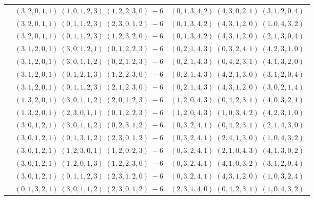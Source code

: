 \documentclass[11pt]{article}
\begin{document}
\begin{longtable}[l]{|c|c|c|}
 \cline{2-3} 
 & $(3 ,2 ,0 ,1 ,1) \;(1 ,0 ,1 ,2 ,3) \;(1 ,2 ,2 ,3 ,0) \;-6$ & $(0 ,1 ,3 ,4 ,2) \;(4 ,3 ,0 ,2 ,1) \;(3 ,1 ,2 ,0 ,4) \;$\\ 
 \cline{2-3} 
 & $(3 ,2 ,0 ,1 ,1) \;(0 ,1 ,1 ,2 ,3) \;(2 ,3 ,0 ,1 ,2) \;-6$ & $(0 ,1 ,3 ,4 ,2) \;(4 ,3 ,1 ,2 ,0) \;(1 ,0 ,4 ,3 ,2) \;$\\ 
 \cline{2-3} 
 & $(3 ,2 ,0 ,1 ,1) \;(0 ,1 ,1 ,2 ,3) \;(1 ,2 ,3 ,2 ,0) \;-6$ & $(0 ,1 ,3 ,4 ,2) \;(4 ,3 ,1 ,2 ,0) \;(2 ,1 ,3 ,0 ,4) \;$\\ 
 \cline{2-3} 
 & $(3 ,1 ,2 ,0 ,1) \;(3 ,0 ,1 ,2 ,1) \;(0 ,1 ,2 ,2 ,3) \;-6$ & $(0 ,2 ,1 ,4 ,3) \;(0 ,3 ,2 ,4 ,1) \;(4 ,2 ,3 ,1 ,0) \;$\\ 
 \cline{2-3} 
 & $(3 ,1 ,2 ,0 ,1) \;(3 ,0 ,1 ,1 ,2) \;(0 ,2 ,1 ,2 ,3) \;-6$ & $(0 ,2 ,1 ,4 ,3) \;(0 ,4 ,2 ,3 ,1) \;(4 ,1 ,3 ,2 ,0) \;$\\ 
 \cline{2-3} 
 & $(3 ,1 ,2 ,0 ,1) \;(0 ,1 ,2 ,1 ,3) \;(1 ,2 ,2 ,3 ,0) \;-6$ & $(0 ,2 ,1 ,4 ,3) \;(4 ,2 ,1 ,3 ,0) \;(3 ,1 ,2 ,0 ,4) \;$\\ 
 \cline{2-3} 
 & $(3 ,1 ,2 ,0 ,1) \;(0 ,1 ,1 ,2 ,3) \;(2 ,1 ,2 ,3 ,0) \;-6$ & $(0 ,2 ,1 ,4 ,3) \;(4 ,3 ,1 ,2 ,0) \;(3 ,0 ,2 ,1 ,4) \;$\\ 
 \cline{2-3} 
 & $(1 ,3 ,2 ,0 ,1) \;(3 ,0 ,1 ,1 ,2) \;(2 ,0 ,1 ,2 ,3) \;-6$ & $(1 ,2 ,0 ,4 ,3) \;(0 ,4 ,2 ,3 ,1) \;(4 ,0 ,3 ,2 ,1) \;$\\ 
 \cline{2-3} 
 & $(1 ,3 ,2 ,0 ,1) \;(2 ,3 ,0 ,1 ,1) \;(0 ,1 ,2 ,2 ,3) \;-6$ & $(1 ,2 ,0 ,4 ,3) \;(1 ,0 ,3 ,4 ,2) \;(4 ,2 ,3 ,1 ,0) \;$\\ 
 \cline{2-3} 
 & $(3 ,0 ,1 ,2 ,1) \;(3 ,0 ,1 ,1 ,2) \;(0 ,2 ,3 ,1 ,2) \;-6$ & $(0 ,3 ,2 ,4 ,1) \;(0 ,4 ,2 ,3 ,1) \;(2 ,1 ,4 ,3 ,0) \;$\\ 
 \cline{2-3} 
 & $(3 ,0 ,1 ,2 ,1) \;(0 ,1 ,3 ,1 ,2) \;(2 ,3 ,0 ,1 ,2) \;-6$ & $(0 ,3 ,2 ,4 ,1) \;(2 ,4 ,1 ,3 ,0) \;(1 ,0 ,4 ,3 ,2) \;$\\ 
 \cline{2-3} 
 & $(3 ,0 ,1 ,2 ,1) \;(1 ,2 ,3 ,0 ,1) \;(1 ,2 ,0 ,2 ,3) \;-6$ & $(0 ,3 ,2 ,4 ,1) \;(2 ,1 ,0 ,4 ,3) \;(4 ,1 ,3 ,0 ,2) \;$\\ 
 \cline{2-3} 
 & $(3 ,0 ,1 ,2 ,1) \;(1 ,2 ,0 ,1 ,3) \;(1 ,2 ,2 ,3 ,0) \;-6$ & $(0 ,3 ,2 ,4 ,1) \;(4 ,1 ,0 ,3 ,2) \;(3 ,1 ,2 ,0 ,4) \;$\\ 
 \cline{2-3} 
 & $(3 ,0 ,1 ,2 ,1) \;(0 ,1 ,1 ,2 ,3) \;(2 ,3 ,1 ,2 ,0) \;-6$ & $(0 ,3 ,2 ,4 ,1) \;(4 ,3 ,1 ,2 ,0) \;(1 ,0 ,3 ,2 ,4) \;$\\ 
 \cline{2-3} 
 & $(0 ,1 ,3 ,2 ,1) \;(3 ,0 ,1 ,1 ,2) \;(2 ,3 ,0 ,1 ,2) \;-6$ & $(2 ,3 ,1 ,4 ,0) \;(0 ,4 ,2 ,3 ,1) \;(1 ,0 ,4 ,3 ,2) \;$\\ 

\end{longtable}
\end{document}
